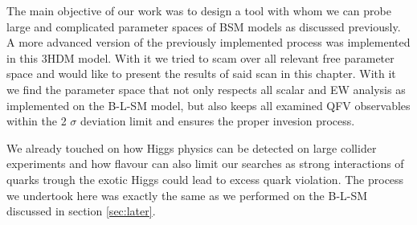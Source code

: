 The main objective of our work was to design a tool with whom we can probe large and complicated parameter spaces of BSM models as discussed previously. 
%
A more advanced version of the previously implemented process was implemented in this 3HDM model.
%
With it we tried to scam over all relevant free parameter space and would like to present the results of said scan in this chapter. 
%
%
With it we find the parameter space that not only respects all scalar and EW analysis as implemented on the B-L-SM model, but also keeps all examined QFV observables within the 2 $\sigma$ deviation limit and ensures the proper invesion process. 

We already touched on how Higgs physics can be detected on large collider experiments and how flavour can also limit our searches as strong interactions of quarks trough the exotic Higgs could lead to excess quark violation. %
%
The process we undertook here was exactly the same as we performed on the B-L-SM discussed in section \ref{sec:later}. 

